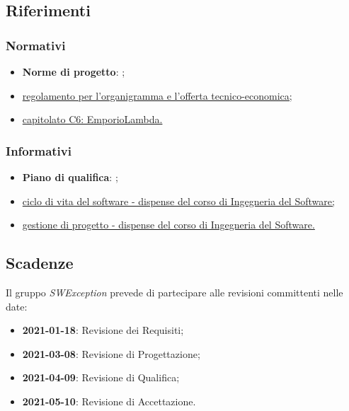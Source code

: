\subsection{Riferimenti}

\subsubsection{Normativi}
\begin{itemize}
    \item \textbf{Norme di progetto}: ;
    \item \href{https://www.math.unipd.it/~tullio/IS-1/2020/Progetto/RO.html}{regolamento per l'organigramma e l'offerta tecnico-economica;}
    \item \href{https://www.math.unipd.it/~tullio/IS-1/2020/Progetto/C2.pdf}{capitolato C6: EmporioLambda.}
\end{itemize}

\subsubsection{Informativi}
\begin{itemize}
    \item \textbf{Piano di qualifica}: ;
    \item \href{https://www.math.unipd.it/~tullio/IS-1/2020/Dispense/L05.pdf}{ciclo di vita del software - dispense del corso di Ingegneria del Software;}
    \item \href{https://www.math.unipd.it/~tullio/IS-1/2020/Dispense/L05.pdf}{gestione di progetto - dispense del corso di Ingegneria del Software.}
\end{itemize}

\subsection{Scadenze}
Il gruppo \textit{SWException} prevede di partecipare alle revisioni committenti nelle date:
\begin{itemize}
    \item \textbf{2021-01-18}: Revisione dei Requisiti;
    \item \textbf{2021-03-08}: Revisione di Progettazione;
    \item \textbf{2021-04-09}: Revisione di Qualifica;
    \item \textbf{2021-05-10}: Revisione di Accettazione.
\end{itemize}